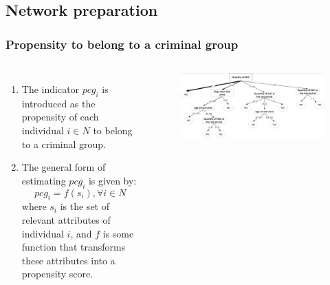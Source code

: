 \documentclass[aspectratio=169]{beamer}
\begin{document}
\subsection{Network preparation}
\begin{frame}
\frametitle{Propensity to belong to a criminal group}
  \begin{columns}
    \begin{enumerate}
      \item The indicator $pcg_i$ is introduced as the propensity of each individual $i \in N$ to belong to a criminal group.
      \item The general form of estimating $pcg_i$ is given by:
      \begin{equation*}
        pcg_i = f(s_i), \forall i \in N
      \end{equation*}
      where $s_i$ is the set of relevant attributes of individual $i$, and $f$ is some function that transforms these attributes into a propensity score.
    \end{enumerate}
    \begin{figure}[ht]
      \centering
      \includegraphics[width=\textwidth]{images/decision-tree.png}
    \end{figure}
  \end{columns}
\end{frame}
\end{document}
